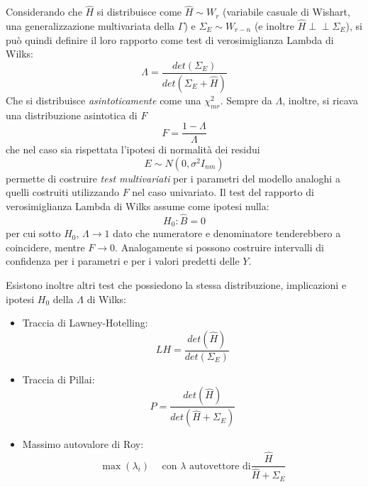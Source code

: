 \documentclass[a4page, 11pt]{article} %
\def\indep{\perp \!\!\! \perp }   %
\begin{document}
Considerando che $\hat{H}$ si distribuisce come $\hat{H} \sim W_r$ (variabile casuale di Wishart, una generalizzazione multivariata della $\Gamma$) e $\Sigma_E \sim W_{r - n}$ (e inoltre $\hat{H} \indep \Sigma_E$), si può quindi definire il loro rapporto come test di verosimiglianza Lambda di Wilks:
\begin{equation*}
  \Lambda = \frac{det(\Sigma_E)}{det(\Sigma_E + \hat{H})}
\end{equation*}
Che si distribuisce \textit{asintoticamente} come una $\chi^2_{mr}$.
Sempre da $\Lambda$, inoltre, si ricava una distribuzione asintotica di $F$
\begin{equation*}
F = \frac{1 - \Lambda}{\Lambda}
\end{equation*}
che nel caso sia rispettata l'ipotesi di normalità dei residui
\begin{equation*}
E \sim N(0,\sigma^2 I_{nm})
\end{equation*}
permette di costruire \textit{test multivariati} per i parametri  del modello analoghi a quelli costruiti utilizzando $F$ nel caso univariato.
Il test del rapporto di verosimiglianza Lambda di Wilks assume come ipotesi nulla: 
\begin{equation*}
H_0 : \hat{B} = 0 
\end{equation*} 
per cui sotto $H_0$, $\Lambda \to 1$ dato che numeratore e denominatore tenderebbero a coincidere, mentre $F \to 0$.
Analogamente si possono costruire intervalli di confidenza per i parametri e per i valori predetti delle $Y$.

Esistono inoltre altri test che possiedono la stessa distribuzione, implicazioni e ipotesi $H_0$ della $\Lambda$ di Wilks:
\begin{itemize}[noitemsep]
\item Traccia di Lawney-Hotelling:
\begin{equation*}
LH = \frac{det(\hat{H})}{det(\Sigma_E)}
\end{equation*}
\item Traccia di Pillai:
\begin{equation*}
P = \frac{det(\hat{H})}{det(\hat{H} + \Sigma_E)}
\end{equation*}
\item Massimo autovalore di Roy:
\begin{equation*}
\max(\lambda_i) \hspace{15pt} \text{con $\lambda$ autovettore di} \frac{\hat{H}}{\hat{H} + \Sigma_E}
\end{equation*}
\end{itemize}
\end{document}
